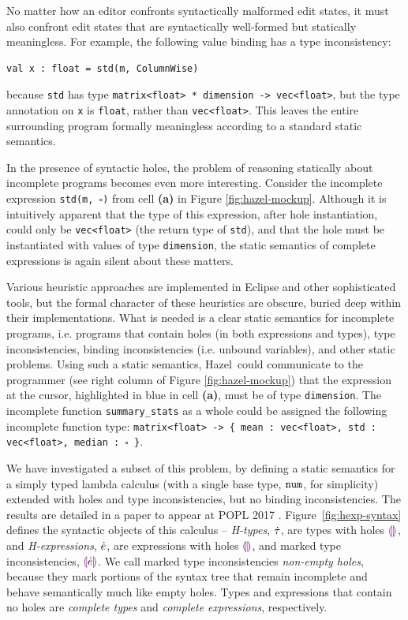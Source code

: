 \documentclass[letterpaper,USenglish]{lipics-v2016}
\let\li\lstinline
\newcommand{\Hazel}[0]{\textsf{Hazel}}
\newcommand{\HazelEnv}[0]{\Hazel}
\begin{document}
No matter how an 
editor confronts syntactically malformed edit states, it must also confront 
edit states that are syntactically well-formed but statically meaningless. For
example, the following value binding has a type inconsistency:
\begin{lstlisting}[numbers=none]
val x : float = std(m, ColumnWise)
\end{lstlisting}
because \li{std} has type \li{matrix<float> * dimension -> vec<float>},
but the type annotation on \li{x} is \li{float}, rather than \li{vec<float>}. This leaves the entire surrounding program
formally meaningless according to a standard static semantics.

In the presence of syntactic holes, the problem of reasoning statically about incomplete programs 
becomes even more interesting.  Consider the incomplete expression \texttt{std(m,~$\square$)} 
from cell \textbf{(a)} in Figure \ref{fig:hazel-mockup}.
%
%
Although it is intuitively apparent that the type of this expression, after hole instantiation, could only be \lstinline{vec<float>} (the return type of \lstinline{std}),
and that the hole must be instantiated with values of type \li{dimension}, the static
semantics of complete expressions is again silent about these matters. 

Various heuristic
approaches are implemented in Eclipse and other sophisticated tools, but the 
formal character of these heuristics are obscure, buried deep within their implementations. What is needed is a clear static semantics for incomplete programs, i.e. programs that contain holes (in both expressions and types), type inconsistencies, binding inconsistencies (i.e. unbound variables), and
other static problems. Using such a static semantics, \HazelEnv~could 
communicate to the programmer (see right column of Figure \ref{fig:hazel-mockup}) that the expression at the cursor, highlighted in blue in cell \textbf{(a)}, must be of type \li{dimension}. The incomplete function
\li{summary_stats} as a whole could be assigned the following incomplete function
type: \texttt{matrix<float> -> \{ {mean} : vec<float>, std : vec<float>, median :~$\square$ \}}.

We have investigated a subset of this problem, by defining a static
semantics for a simply typed lambda calculus (with a 
single base type, $\texttt{num}$, for simplicity) extended with holes and type
inconsistencies, but no binding inconsistencies. The results are detailed in a paper to appear at POPL 2017 \cite{popl-paper}. Figure~\ref{fig:hexp-syntax} defines the syntactic
objects of this calculus -- \emph{H-types}, $\dot{\tau}$,
are types with holes $\textcolor{violet}{\llparenthesis}\textcolor{violet}{\rrparenthesis}$, and \emph{H-expressions}, $\dot{e}$, are
expressions with holes $\textcolor{violet}{\llparenthesis}\textcolor{violet}{\rrparenthesis}$, and marked type inconsistencies,
$\textcolor{violet}{\llparenthesis}\dot{e}\textcolor{violet}{\rrparenthesis}$. We call marked type inconsistencies \emph{non-empty holes},
because they mark portions of the syntax tree that remain
incomplete and behave semantically much like empty holes. Types and expressions that contain no holes are \emph{complete
  types} and \emph{complete expressions}, respectively.
\end{document}
